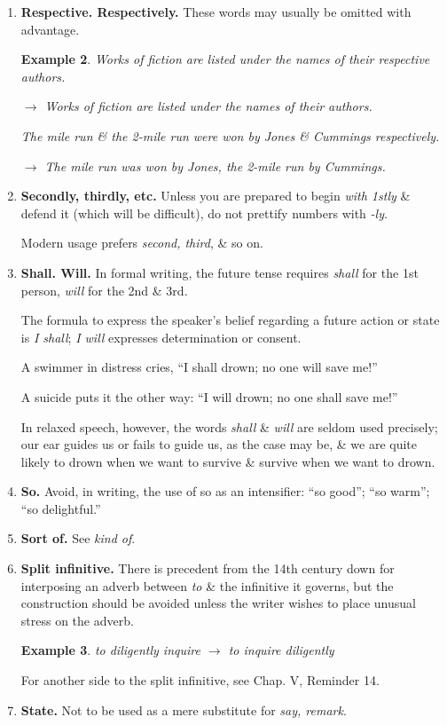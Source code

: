\documentclass{article}
\newtheorem{example}{Example}
\begin{document}
\begin{enumerate}
\begin{example}
		$\to$ Janet \& I see things the same way./Janet \& I have a lot in common.
	\end{example}
	\item {\bf Respective. Respectively.} These words may usually be omitted with advantage.
	\begin{example}
		Works of fiction are listed under the names of their respective authors.
		
		$\to$ Works of fiction are listed under the names of their authors.
		
		The mile run \& the 2-mile run were won by Jones \& Cummings respectively.
		
		$\to$ The mile run was won by Jones, the 2-mile run by Cummings.
	\end{example}
	\item {\bf Secondly, thirdly, etc.} Unless you are prepared to begin {\it with 1stly} \& defend it (which will be difficult), do not prettify numbers with {\it -ly}.
	
	Modern usage prefers {\it second, third}, \& so on.
	\item {\bf Shall. Will.} In formal writing, the future tense requires {\it shall} for the 1st person, {\it will} for the 2nd \& 3rd.
	
	The formula to express the speaker's belief regarding a future action or state is {\it I shall}; {\it I will} expresses determination or consent.
	
	A swimmer in distress cries, ``I shall drown; no one will save me!''
	
	A suicide puts it the other way: ``I will drown; no one shall save me!''
	
	In relaxed speech, however, the words {\it shall} \& {\it will} are seldom used precisely; our ear guides us or fails to guide us, as the case may be, \& we are quite likely to drown when we want to survive \& survive when we want to drown.
	\item {\bf So.} Avoid, in writing, the use of so as an intensifier: ``so good''; ``so warm''; ``so delightful.''
	\item {\bf Sort of.} See {\it kind of}.
	\item {\bf Split infinitive.} There is precedent from the 14th century down for interposing an adverb between {\it to} \& the infinitive it governs, but the construction should be avoided unless the writer wishes to place unusual stress on the adverb.
	\begin{example}
		to diligently inquire $\to$ to inquire diligently
	\end{example}
	For another side to the split infinitive, see Chap. V, Reminder 14.
	\item {\bf State.} Not to be used as a mere substitute for {\it say, remark}.
	

\end{enumerate}
\end{document}
